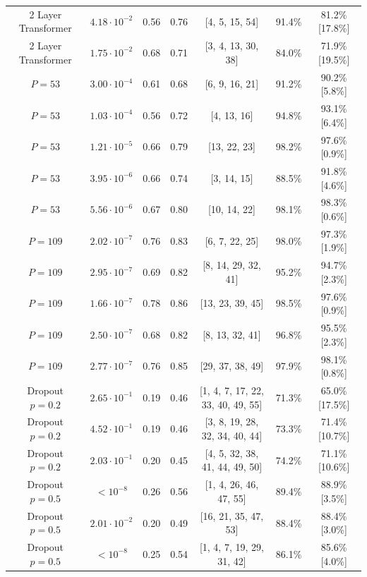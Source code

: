 \documentclass{article} %
\begin{document}
\begin{table}[]
\begin{tabular}{c|c|c|c|c|c|c}
            2 Layer Transformer & $4.18 \cdot 10^{-2}$ & 0.56 & 0.76 & [4, 5, 15, 54] & 91.4\% & 81.2\% [17.8\%] \\
            2 Layer Transformer & $1.75 \cdot 10^{-2}$ & 0.68 & 0.71 & [3, 4, 13, 30, 38] & 84.0\% & 71.9\% [19.5\%] \\
        \hline
            $P=53$ & $3.00 \cdot 10^{-4}$ & 0.61 & 0.68 & [6, 9, 16, 21] & 91.2\% & 90.2\% [5.8\%] \\
            $P=53$ & $1.03 \cdot 10^{-4}$ & 0.56 & 0.72 & [4, 13, 16] & 94.8\% & 93.1\% [6.4\%] \\
            $P=53$ & $1.21 \cdot 10^{-5}$ & 0.66 & 0.79 & [13, 22, 23] & 98.2\% & 97.6\% [0.9\%] \\
            $P=53$ & $3.95 \cdot 10^{-6}$ & 0.66 & 0.74 & [3, 14, 15] & 88.5\% & 91.8\% [4.6\%] \\
            $P=53$ & $5.56 \cdot 10^{-6}$ & 0.67 & 0.80 & [10, 14, 22] & 98.1\% & 98.3\% [0.6\%] \\
         \hline
        $P=109$ & $2.02 \cdot 10^{-7}$ & 0.76 & 0.83 & [6, 7, 22, 25] & 98.0\% & 97.3\% [1.9\%] \\
        $P=109$ & $2.95 \cdot 10^{-7}$ & 0.69 & 0.82 & [8, 14, 29, 32, 41] & 95.2\% & 94.7\% [2.3\%] \\
        $P=109$ & $1.66 \cdot 10^{-7}$ & 0.78 & 0.86 & [13, 23, 39, 45] & 98.5\% & 97.6\% [0.9\%] \\
        $P=109$ & $2.50 \cdot 10^{-7}$ & 0.68 & 0.82 & [8, 13, 32, 41] & 96.8\% & 95.5\% [2.3\%] \\
        $P=109$ & $2.77 \cdot 10^{-7}$ & 0.76 & 0.85 & [29, 37, 38, 49] & 97.9\% & 98.1\% [0.8\%] \\
\hline
Dropout $p=0.2$ & $2.65 \cdot 10^{-1}$ & 0.19 & 0.46 & [1, 4, 7, 17, 22, 33, 40, 49, 55] & 71.3\% & 65.0\% [17.5\%] \\
Dropout $p=0.2$ & $4.52 \cdot 10^{-1}$ & 0.19 & 0.46 & [3, 8, 19, 28, 32, 34, 40, 44] & 73.3\% & 71.4\% [10.7\%] \\
Dropout $p=0.2$ & $2.03 \cdot 10^{-1}$ & 0.20 & 0.45 & [4, 5, 32, 38, 41, 44, 49, 50] & 74.2\% & 71.1\% [10.6\%] \\
         \hline 
Dropout $p=0.5$ & $<10^{-8}$ & 0.26 & 0.56 & [1, 4, 26, 46, 47, 55] & 89.4\% & 88.9\% [3.5\%] \\
Dropout $p=0.5$ & $2.01 \cdot 10^{-2}$ & 0.20 & 0.49 & [16, 21, 35, 47, 53] & 88.4\% & 88.4\% [3.0\%] \\
Dropout $p=0.5$ & $<10^{-8}$ & 0.25 & 0.54 & [1, 4, 7, 19, 29, 31, 42] & 86.1\% & 85.6\% [4.0\%] \\

\end{tabular}
\end{table}
\end{document}
